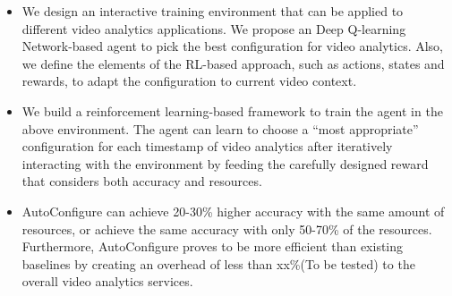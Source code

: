 \begin{itemize}	
\item We design an interactive training environment that can be applied to different video analytics applications. We propose an Deep Q-learning Network-based \cite{DQN} agent to pick the best configuration for video analytics. Also, we define the elements of the RL-based approach, such as actions, states and rewards, to adapt the configuration to current video context.

\item We build a reinforcement learning-based framework to train the agent in the above environment. The agent can learn to choose a ``most appropriate'' configuration for each timestamp of video analytics after iteratively interacting with the environment by feeding the carefully designed reward that considers both accuracy and resources.
 
\item AutoConfigure can achieve 20-30\% higher accuracy with the
same amount of resources, or achieve the same accuracy
with only 50-70\% of the resources. Furthermore, AutoConfigure proves to be more efficient than existing baselines by creating an overhead of less than xx\%\textcolor{note}{(To be tested)} to the overall video analytics services.
\end{itemize}

